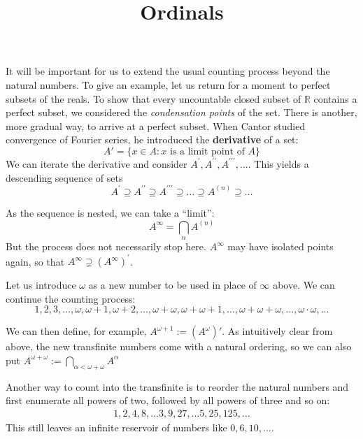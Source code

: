 \documentclass{article}
\title{Ordinals}
\date{\displaydate{articleDate}}
\author{}
\begin{document}
\maketitle

It will be important for us to extend the usual counting process beyond the natural numbers. To give an example, let us return for a moment to perfect subsets of the reals. To show that every uncountable closed subset of $\mathbb{R}$ contains a perfect subset, we considered the \textit{condensation points} of the set. There is another, more gradual way, to arrive at a perfect subset. When Cantor studied convergence of Fourier series, he introduced the \textbf{derivative} of a set:
\begin{equation}

A' = \{ x \in A \colon x \text{ is a limit point of } A\}
\end{equation}
We can iterate the derivative and consider $A^\prime, A^{\prime\prime}, A^{\prime\prime\prime}, \dots$. This yields a descending sequence of sets
\begin{equation}

A^\prime \supseteq  A^{\prime\prime} \supseteq A^{\prime\prime\prime} \supseteq \dots \supseteq A^{(n)} \supseteq \dots
\end{equation}

As the sequence is nested, we can take a ``limit'':
\begin{equation}

A^{\infty} = \bigcap_n A^{(n)}
\end{equation}
But the process does not necessarily stop here. $A^\infty$ may have isolated points again, so that $A^\infty \supsetneq (A^\infty)^\prime$.

Let us introduce $\omega$ as a new number to be used in place of $\infty$ above. We can continue the counting process:
\begin{equation}

1,2,3, \dots, \omega, \omega+1, \omega+2, \dots, \omega + \omega, \omega + \omega +1, \dots, \omega + \omega + \omega, \dots, \omega\cdot \omega, \dots
\end{equation}

We can then define, for example,
$A^{\omega+1} := (A^{\omega})'$. As intuitively clear from above, the new transfinite numbers come with a natural ordering, so we can also put $A^{\omega+\omega} := \bigcap_{\alpha < \omega+\omega} A^{\alpha}$

Another way to count into the transfinite is to reorder the natural numbers and first enumerate all powers of two, followed by all powers of three and so on:
\begin{gather*}
	1, 2, 4, 8, \ldots 3, 9, 27, \ldots 5, 25, 125, \ldots
\end{gather*}
This still leaves an infinite reservoir of numbers like $0, 6, 10, \dots$.
\end{document}
